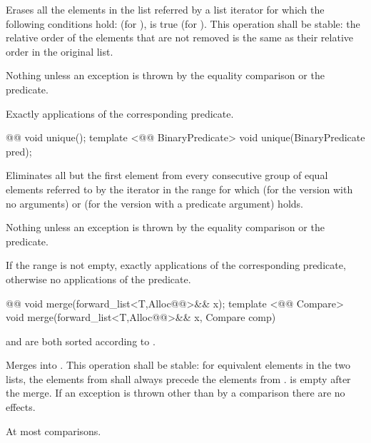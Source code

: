 \documentclass[american,twoside]{book}
\begin{document}
\begin{itemdescr}
\pnum
\effects  Erases all the elements in the list referred by a list iterator  for which the following conditions hold:  (for ),  is true (for ). This operation shall be stable: the relative order of the elements that are not removed is the same as their relative order in the original list.

\pnum
\throws Nothing unless an exception is thrown by the equality comparison or the predicate.

\pnum
\complexity Exactly  applications of the corresponding predicate.
\end{itemdescr}

\begin{itemdecl}
@@ void unique();
template <@@ BinaryPredicate>
  void unique(BinaryPredicate pred);
\end{itemdecl}

\begin{itemdescr}
\pnum
\effects Eliminates all but the first element from every consecutive group of equal elements referred to by the iterator  in the range  for which  (for the version with no arguments) or  (for the version with a predicate argument) holds.

\pnum
\throws Nothing unless an exception is thrown by the equality comparison or the predicate.

\pnum
\complexity If the range  is not empty, exactly  applications of the corresponding predicate, otherwise no applications of the predicate.
\end{itemdescr}

\begin{itemdecl}
@@ void merge(forward_list<T,Alloc@@>&& x);
template <@@ Compare> 
  void merge(forward_list<T,Alloc@@>&& x, Compare comp)
\end{itemdecl}

\begin{itemdescr}
\pnum
\requires 
{}  and  are both sorted according to 
.

\pnum
\effects Merges  into . This operation shall be stable: for equivalent elements in the two lists, the elements from  shall always precede the elements from .  is empty after the merge. If an exception is thrown other than by a comparison there are no effects.

\pnum
\complexity At most  comparisons.
\end{itemdescr}
\end{document}
